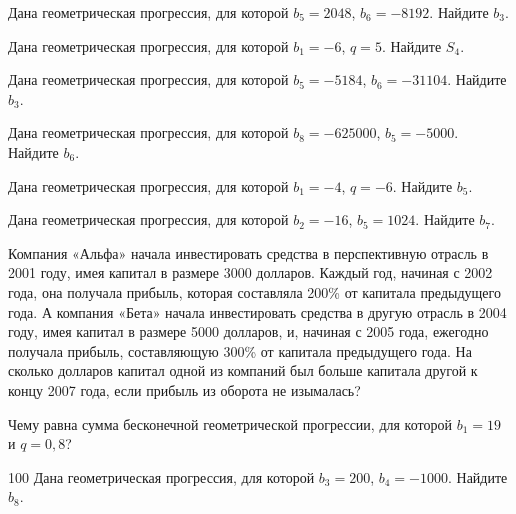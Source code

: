 \documentclass[4apaper]{article}
\begin{document}
\begin{taskBN}{92}
Дана геометрическая прогрессия, для которой $b_{5} = 2048$, $b_{6}=-8192$. Найдите $b_{3}$.
\end{taskBN}

\begin{taskBN}{93}
Дана геометрическая прогрессия, для которой $b_1 = -6$, $q=5$. Найдите $S_{4}$.
\end{taskBN}

\begin{taskBN}{94}
Дана геометрическая прогрессия, для которой $b_{5} = -5184$, $b_{6}=-31104$. Найдите $b_{3}$.
\end{taskBN}

\begin{taskBN}{95}
Дана геометрическая прогрессия, для которой $b_{8} = -625000$, $b_{5}=-5000$. Найдите $b_{6}$.
\end{taskBN}

\begin{taskBN}{96}
Дана геометрическая прогрессия, для которой $b_1 = -4$, $q=-6$. Найдите $b_{5}$.
\end{taskBN}

\begin{taskBN}{97}
Дана геометрическая прогрессия, для которой $b_{2} = -16$, $b_{5}=1024$. Найдите $b_{7}$.
\end{taskBN}

\begin{taskBN}{98}
Компания «Альфа» начала инвестировать средства в перспективную отрасль в 2001 году, имея капитал в размере 3000 долларов. Каждый год, начиная с 2002 года, она получала прибыль, которая составляла 200\% от капитала предыдущего года. А компания «Бета» начала инвестировать средства в другую отрасль в 2004 году, имея капитал в размере 5000 долларов, и, начиная с 2005 года, ежегодно получала прибыль, составляющую 300\% от капитала предыдущего года. На сколько долларов капитал одной из компаний был больше капитала другой к концу 2007 года, если прибыль из оборота не изымалась?
\end{taskBN}

\begin{taskBN}{99}
Чему равна сумма бесконечной геометрической прогрессии, для которой $b_1 = 19$ и $q=0,8$?
\end{taskBN}

\begin{taskBN}{100}
Дана геометрическая прогрессия, для которой $b_{3} = 200$, $b_{4}=-1000$. Найдите $b_{8}$.
\end{taskBN}
\end{document}
